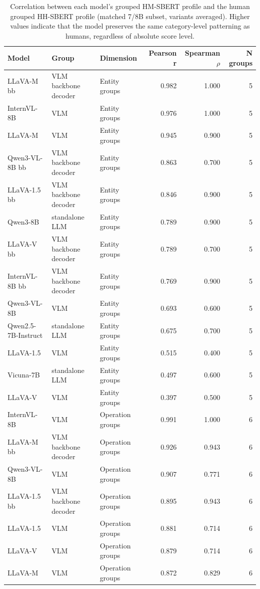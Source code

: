 \begin{table}[t]
\centering
\caption{Correlation between each model's grouped HM-SBERT profile and the human grouped HH-SBERT profile (matched 7/8B subset, variants averaged). Higher values indicate that the model preserves the same category-level patterning as humans, regardless of absolute score level.}
\label{tab:group_pattern_correlation}
\small
\begin{tabular}{lllrrr}
\toprule
Model & Group & Dimension & Pearson r & Spearman $\rho$ & N groups \\
\midrule
LLaVA-M bb & VLM backbone decoder & Entity groups & 0.982 & 1.000 & 5 \\
InternVL-8B & VLM & Entity groups & 0.976 & 1.000 & 5 \\
LLaVA-M & VLM & Entity groups & 0.945 & 0.900 & 5 \\
Qwen3-VL-8B bb & VLM backbone decoder & Entity groups & 0.863 & 0.700 & 5 \\
LLaVA-1.5 bb & VLM backbone decoder & Entity groups & 0.846 & 0.900 & 5 \\
Qwen3-8B & standalone LLM & Entity groups & 0.789 & 0.900 & 5 \\
LLaVA-V bb & VLM backbone decoder & Entity groups & 0.789 & 0.700 & 5 \\
InternVL-8B bb & VLM backbone decoder & Entity groups & 0.769 & 0.900 & 5 \\
Qwen3-VL-8B & VLM & Entity groups & 0.693 & 0.600 & 5 \\
Qwen2.5-7B-Instruct & standalone LLM & Entity groups & 0.675 & 0.700 & 5 \\
LLaVA-1.5 & VLM & Entity groups & 0.515 & 0.400 & 5 \\
Vicuna-7B & standalone LLM & Entity groups & 0.497 & 0.600 & 5 \\
LLaVA-V & VLM & Entity groups & 0.397 & 0.500 & 5 \\
InternVL-8B & VLM & Operation groups & 0.991 & 1.000 & 6 \\
LLaVA-M bb & VLM backbone decoder & Operation groups & 0.926 & 0.943 & 6 \\
Qwen3-VL-8B & VLM & Operation groups & 0.907 & 0.771 & 6 \\
LLaVA-1.5 bb & VLM backbone decoder & Operation groups & 0.895 & 0.943 & 6 \\
LLaVA-1.5 & VLM & Operation groups & 0.881 & 0.714 & 6 \\
LLaVA-V & VLM & Operation groups & 0.879 & 0.714 & 6 \\
LLaVA-M & VLM & Operation groups & 0.872 & 0.829 & 6 \\

\end{tabular}
\end{table}
